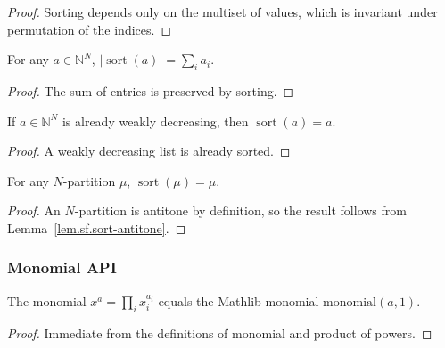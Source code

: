 \begin{proof}
\leanok
Sorting depends only on the multiset of values, which is invariant under permutation of the indices.
\end{proof}

\begin{lemma}
\label{lem.sf.sort-size}
\leanhelper
\leanok
For any $a \in \mathbb{N}^N$, $|\operatorname{sort}(a)| = \sum_i a_i$.
\end{lemma}

\begin{proof}
\leanok
The sum of entries is preserved by sorting.
\end{proof}

\begin{lemma}
\label{lem.sf.sort-antitone}
\leanhelper
\leanok
If $a \in \mathbb{N}^N$ is already weakly decreasing, then $\operatorname{sort}(a) = a$.
\end{lemma}

\begin{proof}
\leanok
A weakly decreasing list is already sorted.
\end{proof}

\begin{lemma}
\label{lem.sf.sort-NPartition}
\leanhelper
\leanok
For any $N$-partition $\mu$, $\operatorname{sort}(\mu) = \mu$.
\end{lemma}

\begin{proof}
\leanok
An $N$-partition is antitone by definition, so the result follows from
Lemma~\ref{lem.sf.sort-antitone}.
\end{proof}

\subsubsection{Monomial API}

\begin{lemma}
\label{lem.sf.monomialExp-eq-monomial}
\leanhelper
\leanok
The monomial $x^a = \prod_i x_i^{a_i}$ equals the Mathlib monomial $\mathrm{monomial}(a, 1)$.
\end{lemma}

\begin{proof}
\leanok
Immediate from the definitions of monomial and product of powers.
\end{proof}

